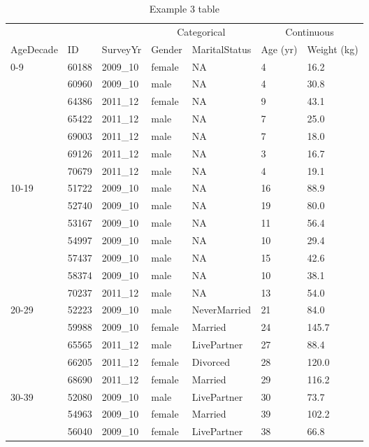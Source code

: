 \documentclass{article}
\begin{document}
\hypertarget{Example 3 table}{} 
\begin{table}[H]
\caption{Example 3 table}\label{ex3} \footnotesize\begin{tabular}{p{3cm}llllll}

\hline
\multicolumn{3}{c}{}&\multicolumn{2}{c}{Categorical}&\multicolumn{2}{c}{Continuous} \\
\cmidrule(lr){4-5} \cmidrule(lr){6-7}
AgeDecade & ID & SurveyYr & Gender & MaritalStatus & Age (yr) & Weight (kg)\\
\hline
 0-9 & 60188 & 2009\_10 & female & NA &  4 &  16.2 \\
 & 60960 & 2009\_10 & male & NA &  4 &  30.8 \\
 & 64386 & 2011\_12 & female & NA &  9 &  43.1 \\
 & 65422 & 2011\_12 & male & NA &  7 &  25.0 \\
 & 69003 & 2011\_12 & male & NA &  7 &  18.0 \\
 & 69126 & 2011\_12 & male & NA &  3 &  16.7 \\
 & 70679 & 2011\_12 & male & NA &  4 &  19.1 \\
[2ex]
 10-19 & 51722 & 2009\_10 & male & NA & 16 &  88.9 \\
 & 52740 & 2009\_10 & male & NA & 19 &  80.0 \\
 & 53167 & 2009\_10 & male & NA & 11 &  56.4 \\
 & 54997 & 2009\_10 & male & NA & 10 &  29.4 \\
 & 57437 & 2009\_10 & male & NA & 15 &  42.6 \\
 & 58374 & 2009\_10 & male & NA & 10 &  38.1 \\
 & 70237 & 2011\_12 & male & NA & 13 &  54.0 \\
[2ex]
 20-29 & 52223 & 2009\_10 & male & NeverMarried & 21 &  84.0 \\
 & 59988 & 2009\_10 & female & Married & 24 & 145.7 \\
 & 65565 & 2011\_12 & male & LivePartner & 27 &  88.4 \\
 & 66205 & 2011\_12 & female & Divorced & 28 & 120.0 \\
 & 68690 & 2011\_12 & female & Married & 29 & 116.2 \\
[2ex]
 30-39 & 52080 & 2009\_10 & male & LivePartner & 30 &  73.7 \\
 & 54963 & 2009\_10 & female & Married & 39 & 102.2 \\
 & 56040 & 2009\_10 & female & LivePartner & 38 &  66.8 \\

\end{tabular}
\end{table}
\end{document}

